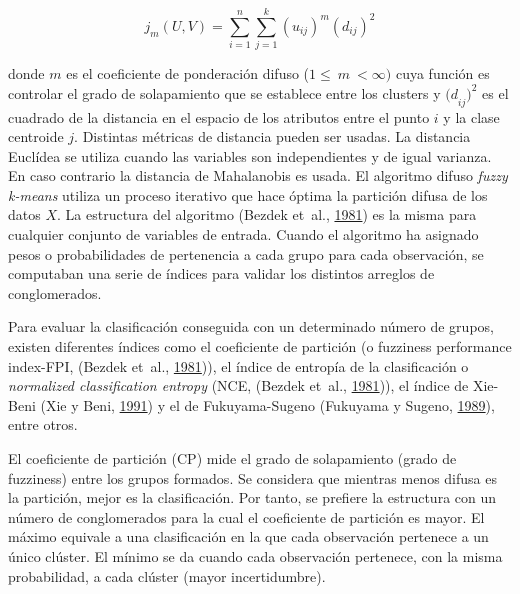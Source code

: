 \documentclass[11pt,b5paper,]{krantz}
\begin{document}
\[j_m(U,V)=\sum_{i=1}^{n}\sum_{j=1}^{k}(u_{ij})^m(d_{ij})^2\]

donde \(m\) es el coeficiente de ponderación difuso (\(1\le\ m\ < \infty)\) cuya función es controlar el grado de solapamiento que se establece entre los clusters y \({{(d}_{ij})}^2\) es el cuadrado de la distancia en el espacio de los atributos entre el punto \(i\) y la clase centroide \(j\). Distintas métricas de distancia pueden ser usadas. La distancia Euclídea se utiliza cuando las variables son independientes y de igual varianza. En caso contrario la distancia de Mahalanobis es usada. El algoritmo difuso \emph{fuzzy k-means} utiliza un proceso iterativo que hace óptima la partición difusa de los datos \(X\). La estructura del algoritmo (Bezdek et~al., \protect\hyperlink{ref-Bezdek_Coray_Gunderson_Watson_1981}{1981}) es la misma para cualquier conjunto de variables de entrada. Cuando el algoritmo ha asignado pesos o probabilidades de pertenencia a cada grupo para cada observación, se computaban una serie de índices para validar los distintos arreglos de conglomerados.

Para evaluar la clasificación conseguida con un determinado número de grupos, existen diferentes índices como el coeficiente de partición (o fuzziness performance index-FPI, (Bezdek et~al., \protect\hyperlink{ref-Bezdek_Coray_Gunderson_Watson_1981}{1981})), el índice de entropía de la clasificación o \emph{normalized classification entropy} (NCE, (Bezdek et~al., \protect\hyperlink{ref-Bezdek_Coray_Gunderson_Watson_1981}{1981})), el índice de Xie-Beni (Xie y Beni, \protect\hyperlink{ref-Xie_Beni_1991}{1991}) y el de Fukuyama-Sugeno (Fukuyama y Sugeno, \protect\hyperlink{ref-Fukuyama_Sugeno_1989}{1989}), entre otros.

El coeficiente de partición (CP) mide el grado de solapamiento (grado de fuzziness) entre los grupos formados. Se considera que mientras menos difusa es la partición, mejor es la clasificación. Por tanto, se prefiere la estructura con un número de conglomerados para la cual el coeficiente de partición es mayor. El máximo equivale a una clasificación en la que cada observación pertenece a un único clúster. El mínimo se da cuando cada observación pertenece, con la misma probabilidad, a cada clúster (mayor incertidumbre).
\end{document}

